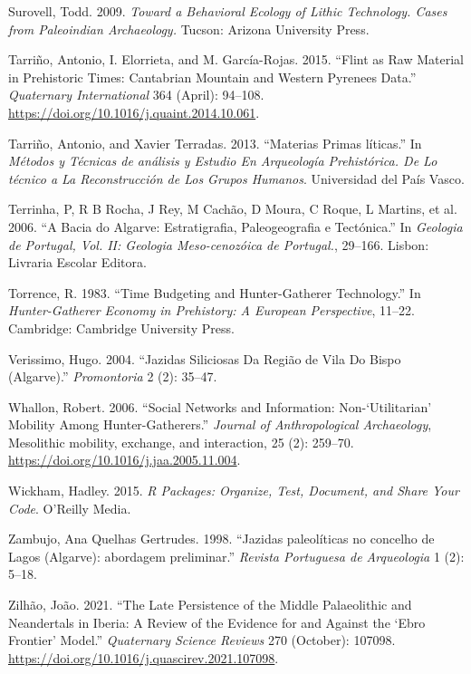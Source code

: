 \documentclass[
  a4paper,
  DIV=11,
  numbers=noendperiod]{scrreprt}
\newlength{\cslhangindent}
\newenvironment{CSLReferences}[2] %
 {\begin{list}{}{%
  \setlength{\itemindent}{0pt}
  \setlength{\leftmargin}{0pt}
  \setlength{\parsep}{0pt}
  \ifodd #1
   \setlength{\leftmargin}{\cslhangindent}
   \setlength{\itemindent}{-1\cslhangindent}
  \fi
  \setlength{\itemsep}{#2\baselineskip}}}
 {\end{list}}
\begin{document}
\begin{CSLReferences}{1}{0}
Surovell, Todd. 2009. \emph{Toward a {Behavioral Ecology} of {Lithic
Technology}. {Cases} from {Paleoindian Archaeology}.} Tucson: Arizona
University Press.

Tarriño, Antonio, I. Elorrieta, and M. García-Rojas. 2015. {``Flint as
Raw Material in Prehistoric Times: {Cantabrian Mountain} and {Western
Pyrenees} Data.''} \emph{Quaternary International} 364 (April): 94--108.
\url{https://doi.org/10.1016/j.quaint.2014.10.061}.

Tarriño, Antonio, and Xavier Terradas. 2013. {``Materias Primas
l{í}ticas.''} In \emph{M{é}todos y {T{é}cnicas} de an{á}lisis y Estudio
En Arqueolog{í}a Prehist{ó}rica. {De} Lo t{é}cnico a La Reconstrucci{ó}n
de Los Grupos Humanos}. Universidad del Pa{í}s Vasco.

Terrinha, P, R B Rocha, J Rey, M Cachão, D Moura, C Roque, L Martins, et
al. 2006. {``{A Bacia do Algarve: Estratigrafia, Paleogeografia e
Tect{ó}nica}.''} In \emph{{Geologia de Portugal, Vol. II: Geologia
Meso-cenoz{ó}ica de Portugal.}}, 29--166. Lisbon: Livraria Escolar
Editora.

Torrence, R. 1983. {``Time Budgeting and Hunter-Gatherer Technology.''}
In \emph{Hunter-{Gatherer Economy} in {Prehistory}: {A European
Perspective}}, 11--22. Cambridge: Cambridge University Press.

Verissimo, Hugo. 2004. {``Jazidas Siliciosas Da Regi{ã}o de {Vila} Do
{Bispo} ({Algarve}).''} \emph{Promontoria} 2 (2): 35--47.

Whallon, Robert. 2006. {``Social Networks and Information:
{Non-}{`Utilitarian'} Mobility Among Hunter-Gatherers.''} \emph{Journal
of Anthropological Archaeology}, Mesolithic mobility, exchange, and
interaction, 25 (2): 259--70.
\url{https://doi.org/10.1016/j.jaa.2005.11.004}.

Wickham, Hadley. 2015. \emph{R {Packages}: {Organize}, {Test},
{Document}, and {Share Your Code}}. O'Reilly Media.

Zambujo, Ana Quelhas Gertrudes. 1998. {``{Jazidas paleol{í}ticas no
concelho de Lagos (Algarve): abordagem preliminar}.''} \emph{Revista
Portuguesa de Arqueologia} 1 (2): 5--18.

Zilhão, João. 2021. {``The Late Persistence of the {Middle Palaeolithic}
and {Neandertals} in {Iberia}: {A} Review of the Evidence for and
Against the {`{Ebro Frontier}'} Model.''} \emph{Quaternary Science
Reviews} 270 (October): 107098.
\url{https://doi.org/10.1016/j.quascirev.2021.107098}.

\end{CSLReferences}
\end{document}

